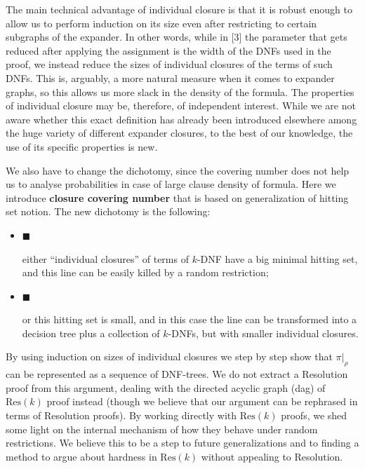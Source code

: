 \documentclass[10pt,a4paper]{article}
\begin{document}
The main technical advantage of individual closure is that it is robust enough to allow us to perform induction
on its size even after restricting to certain subgraphs of the expander.
In other words, while in [3]
the parameter that gets reduced after applying the assignment is the width of the
DNFs used in the proof, we instead reduce the sizes of individual closures of the terms of such
DNFs. This is, arguably, a more natural measure when it comes to expander graphs, so this allows us more
slack in the density of the formula. The properties of individual closure may be, therefore, of
independent interest. While we are not aware whether this exact definition has already been introduced
elsewhere among the huge variety of different expander closures, to the best of our knowledge, the use of
its specific properties is new.\par




We also have to change the dichotomy, since the covering number does not help us to analyse probabilities
in case of large clause density of formula. Here we introduce \textbf{closure covering number} that is
based on generalization of hitting set notion. The new dichotomy is the following:\par


\begin{itemize}


\item[] 
$\blacksquare$ 


either “individual closures” of terms of $k$-DNF have a big minimal hitting set, and this
line can be easily killed by a random restriction;\par





\item[] 
$\blacksquare$ 


or this hitting set is small, and in this case the line can be transformed into a decision tree
plus a collection of $k$-DNFs, but with smaller individual closures.\par





\end{itemize}


By using induction on sizes of individual closures we step by step show that $\pi|_{\rho}$ can be
represented as a sequence of DNF-trees. We do not extract a Resolution proof from this argument,
dealing with the directed acyclic graph (dag) of $\mathrm{Res}(k)$ proof instead (though we believe that our argument can be rephrased in
terms of Resolution proofs). By working directly with $\mathrm{Res}(k)$ proofs, we shed some light on the
internal mechanism of how they behave under random restrictions. We believe this to be a step to future
generalizations and to finding a method to argue about hardness in $\mathrm{Res}(k)$ without appealing to
Resolution.\par
\end{document}
